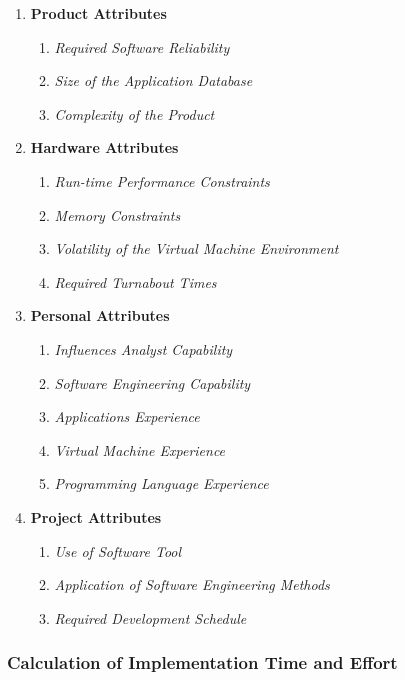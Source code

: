 \begin{enumerate}
	\item \textbf{Product Attributes}
	\begin{enumerate}
		\item \textit{Required Software Reliability}
		\item \textit{Size of the Application Database}
		\item \textit{Complexity of the Product}
	\end{enumerate}
	\item \textbf{Hardware Attributes}
	\begin{enumerate}
		\item \textit{Run-time Performance Constraints}
		\item \textit{Memory Constraints}
		\item \textit{Volatility of the Virtual Machine Environment }
		\item \textit{Required Turnabout Times}
	\end{enumerate}
	\item \textbf{Personal Attributes}
	\begin{enumerate}
		\item \textit{Influences Analyst Capability}
		\item \textit{Software Engineering Capability}
		\item \textit{Applications Experience}
		\item \textit{Virtual Machine Experience}
		\item \textit{Programming Language Experience}
	\end{enumerate}
	\item \textbf{Project Attributes}
	\begin{enumerate}
		\item \textit{Use of Software Tool}
		\item \textit{Application of Software Engineering Methods}
		\item \textit{Required Development Schedule}
	\end{enumerate}
\end{enumerate}

\subsubsection{Calculation of Implementation Time and Effort}

